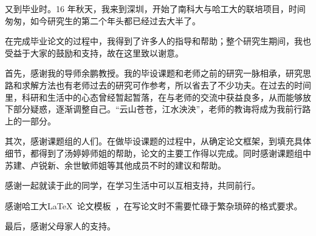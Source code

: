 \begin{acknowledgements}

又到毕业时。16 年秋天，我来到深圳，开始了南科大与哈工大的联培项目，时间匆匆，如今研究生的第二个年头都已经过去大半了。

在完成毕业论文的过程中，我得到了许多人的指导和帮助；整个研究生期间，我也受益于大家的鼓励和支持，故在这里致以谢意。

首先，感谢我的导师余鹏教授。我的毕设课题和老师之前的研究一脉相承，研究思路和求解方法也有老师过去的研究可作参考，所以省去了不少功夫。在过去的时间里，科研和生活中的心态曾经暂起暂落，在与老师的交流中获益良多，从而能够放下部分疑惑，逐渐调整自己。“云山苍苍，江水泱泱”，老师的教诲将成为我前行路上的一部分。

其次，感谢课题组的人们。在做毕设课题的过程中，从确定论文框架，到填充具体细节，都得到了汤婷婷师姐的帮助，论文的主要工作得以完成。同时感谢课题组中苏建、卢锐新、余世敏师姐等其他成员不时的建议和帮助。

感谢一起就读于此的同学，在学习生活中可以互相支持，共同前行。

感谢哈工大\LaTeX\ 论文模板\hithesis\ ，在写论文时不需要忙碌于繁杂琐碎的格式要求。

最后，感谢父母家人的支持。



\end{acknowledgements}
